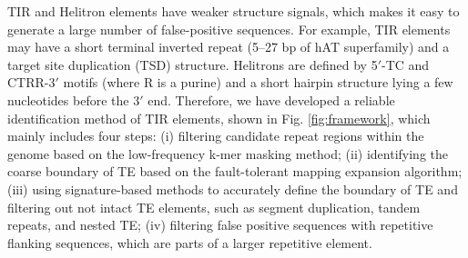 \documentclass{bmcart}
\begin{document}
TIR and Helitron elements have weaker structure signals, which makes it easy to generate a large number of false-positive sequences. For example, TIR elements may have a short terminal inverted repeat (5–27 bp of hAT superfamily) and a target site duplication (TSD) structure. Helitrons are defined by 5$'$-TC and CTRR-3$'$ motifs (where R is a purine) and a short hairpin structure lying a few nucleotides before the 3$'$ end. Therefore, we have developed a reliable identification method of TIR elements, shown in Fig. \ref{fig:framework}, which mainly includes four steps: (i) filtering candidate repeat regions within the genome based on the low-frequency k-mer masking method; (ii) identifying the coarse boundary of TE based on the fault-tolerant mapping expansion algorithm; (iii) using signature-based methods to accurately define the boundary of TE and filtering out not intact TE elements, such as segment duplication, tandem repeats, and nested TE; (iv) filtering false positive sequences with repetitive flanking sequences, which are parts of a larger repetitive element.
\end{document}
